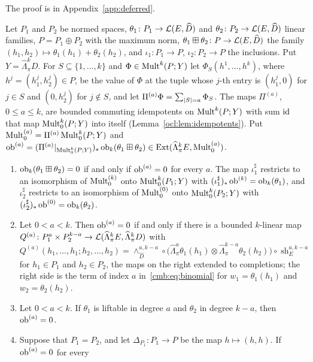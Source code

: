 The proof is in Appendix~\ref{app:deferred}.

\begin{theorem}\label{cmb:thm:cartan}
Let $P_1$ and $P_2$ be normed spaces, $\theta_1\colon P_1\to\mathcal L(E,\widehat D)$ and $\theta_2\colon P_2\to\mathcal L(E,\widehat D)$
linear families, $P=P_1\oplus P_2$ with the maximum norm, $\theta_1\boxplus\theta_2\colon P\to\mathcal L(E,\widehat D)$ the family
$(h_1,h_2)\mapsto\theta_1(h_1)+\theta_2(h_2)$, and $\iota_1\colon P_1\to P$, $\iota_2\colon P_2\to P$ the inclusions. Put
$Y=\widehat\Lambda^k_\pi D$. For $S\subseteq\{1,\dots,k\}$ and $\Phi\in\operatorname{Mult}^k(P;Y)$ let $\Phi_S(h^1,\dots,h^k)$, where
$h^j=(h^j_1,h^j_2)\in P$, be the value of $\Phi$ at the tuple whose $j$-th entry is $(h^j_1,0)$ for $j\in S$ and $(0,h^j_2)$
for $j\notin S$, and let $\Pi^{(a)}\Phi=\sum_{\lvert S\rvert=a}\Phi_S$. The maps $\Pi^{(a)}$, $0\le a\le k$, are bounded commuting
idempotents on $\operatorname{Mult}^k(P;Y)$ with sum $\mathrm{id}$ that map $\operatorname{Mult}^k_0(P;Y)$ into itself (Lemma~\ref{ocl:lem:idempotents}). Put
$\operatorname{Mult}^{(a)}_0=\Pi^{(a)}\operatorname{Mult}^k_0(P;Y)$ and
$\operatorname{ob}^{(a)}=(\Pi^{(a)}|_{\operatorname{Mult}^k_0(P;Y)})_*\operatorname{ob}_k(\theta_1\boxplus\theta_2)\in\operatorname{Ext}(\widehat\Lambda^k_\pi E,\operatorname{Mult}^{(a)}_0)$.
\begin{enumerate}
\item $\operatorname{ob}_k(\theta_1\boxplus\theta_2)=0$ if and only if $\operatorname{ob}^{(a)}=0$ for every $a$. The map $\iota_1^\sharp$ restricts to an
isomorphism of $\operatorname{Mult}^{(k)}_0$ onto $\operatorname{Mult}^k_0(P_1;Y)$ with $(\iota_1^\sharp)_*\operatorname{ob}^{(k)}=\operatorname{ob}_k(\theta_1)$, and $\iota_2^\sharp$
restricts to an isomorphism of $\operatorname{Mult}^{(0)}_0$ onto $\operatorname{Mult}^k_0(P_2;Y)$ with $(\iota_2^\sharp)_*\operatorname{ob}^{(0)}=\operatorname{ob}_k(\theta_2)$.
\item Let $0<a<k$. Then $\operatorname{ob}^{(a)}=0$ if and only if there is a bounded $k$-linear map
$Q^{(a)}\colon P_1^a\times P_2^{k-a}\to\mathcal L(\widehat\Lambda^k_\pi E,\widehat\Lambda^k_\pi D)$ with
\[
 Q^{(a)}(h_1,\dots,h_1;h_2,\dots,h_2)=\wedge^{a,k-a}_{\widehat D}\circ\bigl(\widehat\Lambda^a_\pi\theta_1(h_1)\otimes
 \widehat\Lambda^{k-a}_\pi\theta_2(h_2)\bigr)\circ\operatorname{sh}^{a,k-a}_E
\]
for $h_1\in P_1$ and $h_2\in P_2$, the maps on the right extended to completions; the right side is the term of index $a$
in~\eqref{cmb:eq:binomial} for $w_1=\theta_1(h_1)$ and $w_2=\theta_2(h_2)$.
\item Let $0<a<k$. If $\theta_1$ is liftable in degree $a$ and $\theta_2$ in degree $k-a$, then $\operatorname{ob}^{(a)}=0$.
\item Suppose that $P_1=P_2$, and let $\Delta_{P_1}\colon P_1\to P$ be the map $h\mapsto(h,h)$. If $\operatorname{ob}^{(a)}=0$ for every

\end{enumerate}
\end{theorem}
